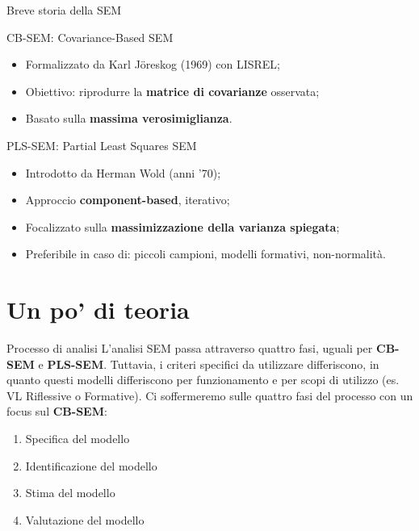 \documentclass{beamer}
\begin{document}
\begin{frame}{Breve storia della SEM}
    \begin{block}{CB-SEM: Covariance-Based SEM}
        \begin{itemize}
            \item Formalizzato da Karl Jöreskog (1969) con LISREL;
            \item Obiettivo: riprodurre la \textbf{matrice di covarianze} osservata;
            \item Basato sulla \textbf{massima verosimiglianza}.
        \end{itemize}
    \end{block}
    \begin{block}{PLS-SEM: Partial Least Squares SEM}
        \begin{itemize}
            \item Introdotto da Herman Wold (anni '70);
            \item Approccio \textbf{component-based}, iterativo;
            \item Focalizzato sulla \textbf{massimizzazione della varianza spiegata};
            \item Preferibile in caso di: piccoli campioni, modelli formativi, non-normalità.
        \end{itemize}
    \end{block}
\end{frame}

\section{Un po' di teoria}
\begin{frame}{Processo di analisi}
    L'analisi SEM passa attraverso quattro fasi, uguali per \textbf{CB-SEM} e \textbf{PLS-SEM}. Tuttavia, i criteri specifici da utilizzare differiscono, in quanto questi modelli differiscono per funzionamento e per scopi di utilizzo (es. VL Riflessive o Formative). Ci soffermeremo sulle quattro fasi del processo con un focus sul \textbf{CB-SEM}: \\
    \vspace{1em}
    \begin{enumerate}
        \item Specifica del modello
        \item Identificazione del modello
        \item Stima del modello
        \item Valutazione del modello
    \end{enumerate} 
\end{frame}
\end{document}
